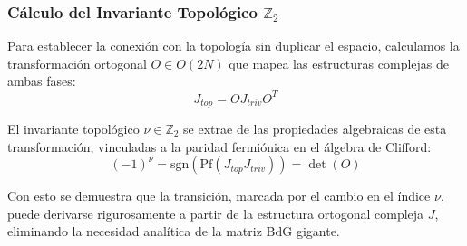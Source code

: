 \begin{frame}
  \frametitle{Cálculo del Invariante Topológico $\mathbb{Z}_2$}

  Para establecer la conexión con la topología sin duplicar el espacio, calculamos la transformación ortogonal $O \in O(2N)$ que mapea las estructuras complejas de ambas fases:
  \begin{equation}
      J_{top} = O J_{triv} O^T
  \end{equation}

  El invariante topológico $\nu \in \mathbb{Z}_2$ se extrae de las propiedades algebraicas de esta transformación, vinculadas a la paridad fermiónica en el álgebra de Clifford:
  \begin{equation}
      (-1)^\nu = \text{sgn}\left( \text{Pf}(J_{top} J_{triv}) \right) = \det(O)
  \end{equation}

  \vspace{0.2cm}
  Con esto se demuestra que la transición, marcada por el cambio en el índice $\nu$, puede derivarse rigurosamente a partir de la estructura ortogonal compleja $J$, eliminando la necesidad analítica de la matriz BdG gigante.
\end{frame}
